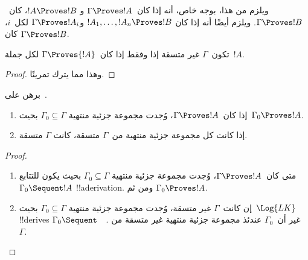 \documentclass[../../../include/open-logic-section]{subfiles}
\begin{document}
ويلزم من هذا، بوجه خاص، أنه إذا كان~$\Gamma \Proves !A$ و
$!A \Proves !B$، كان~$\Gamma \Proves !B$. ويلزم أيضًا أنه إذا كان
$!A_1, \dots, !A_n \Proves !B$ و$\Gamma \Proves !A_i$ لكل~$i$، كان
$\Gamma \Proves !B$.

\begin{prop}
تكون~$\Gamma$ غير متسقة إذا وفقط إذا كان~$\Gamma \Proves {!A}$ لكل
جملة~$!A$.
\end{prop}

\begin{proof}
وهذا مما يترك تمرينًا.
\end{proof}

\begin{prob}
برهن على~.
\end{prob}

\begin{prop}[التراص]
  \begin{enumerate}
  \item إذا كان~$\Gamma \Proves !A$، وُجدت مجموعة جزئية منتهية
    $\Gamma_0 \subseteq \Gamma$ بحيث~$\Gamma_0 \Proves !A$.
  \item إذا كانت كل مجموعة جزئية منتهية من~$\Gamma$ متسقة، كانت
    $\Gamma$ متسقة.
  \end{enumerate}
\end{prop}

\begin{proof}
  \begin{enumerate}
    \item متى كان~$\Gamma \Proves !A$، وُجدت مجموعة جزئية منتهية
      $\Gamma_0 \subseteq \Gamma$ بحيث يكون للتتابع
      $\Gamma_0 \Sequent !A$ !!a{derivation}. ومن ثم
      $\Gamma_0 \Proves !A$.
    \item إن كانت~$\Gamma$ غير متسقة، وُجدت مجموعة جزئية منتهية
      $\Gamma_0 \subseteq \Gamma$ بحيث~$\Log{LK}$ !!{derive}s
      $\Gamma_0 \Sequent \quad$. غير أن~$\Gamma_0$ عندئذ مجموعة جزئية
      منتهية غير متسقة من~$\Gamma$.
  \end{enumerate}
\end{proof}
\end{document}
